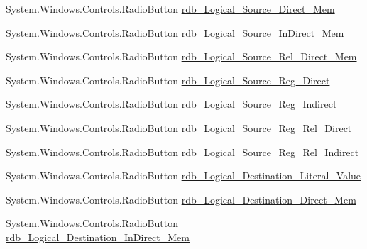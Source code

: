 \begin{DoxyCompactItemize}
\item 
System.\+Windows.\+Controls.\+Radio\+Button \hyperlink{class_c_p_u___o_s___simulator_1_1_instructions_window_ac6abe68bab4a6fbd16381f0524b36597}{rdb\+\_\+\+Logical\+\_\+\+Source\+\_\+\+Direct\+\_\+\+Mem}
\item 
System.\+Windows.\+Controls.\+Radio\+Button \hyperlink{class_c_p_u___o_s___simulator_1_1_instructions_window_a793b4134523511acef0c0212cb7a04fd}{rdb\+\_\+\+Logical\+\_\+\+Source\+\_\+\+In\+Direct\+\_\+\+Mem}
\item 
System.\+Windows.\+Controls.\+Radio\+Button \hyperlink{class_c_p_u___o_s___simulator_1_1_instructions_window_a1611a37bbfa3082c1d5b1e6cb4b6374d}{rdb\+\_\+\+Logical\+\_\+\+Source\+\_\+\+Rel\+\_\+\+Direct\+\_\+\+Mem}
\item 
System.\+Windows.\+Controls.\+Radio\+Button \hyperlink{class_c_p_u___o_s___simulator_1_1_instructions_window_aa29eed1b443e623542ec94bedba2dbaf}{rdb\+\_\+\+Logical\+\_\+\+Source\+\_\+\+Reg\+\_\+\+Direct}
\item 
System.\+Windows.\+Controls.\+Radio\+Button \hyperlink{class_c_p_u___o_s___simulator_1_1_instructions_window_ae7d85bca09170c0028ecb4455189f2cf}{rdb\+\_\+\+Logical\+\_\+\+Source\+\_\+\+Reg\+\_\+\+Indirect}
\item 
System.\+Windows.\+Controls.\+Radio\+Button \hyperlink{class_c_p_u___o_s___simulator_1_1_instructions_window_a1da5b1da06fb53fbfe626829e48e77b4}{rdb\+\_\+\+Logical\+\_\+\+Source\+\_\+\+Reg\+\_\+\+Rel\+\_\+\+Direct}
\item 
System.\+Windows.\+Controls.\+Radio\+Button \hyperlink{class_c_p_u___o_s___simulator_1_1_instructions_window_aef460d19110a239be5ce82ce747b1f5b}{rdb\+\_\+\+Logical\+\_\+\+Source\+\_\+\+Reg\+\_\+\+Rel\+\_\+\+Indirect}
\item 
System.\+Windows.\+Controls.\+Radio\+Button \hyperlink{class_c_p_u___o_s___simulator_1_1_instructions_window_a424e07112a50a407196c743bdb259b84}{rdb\+\_\+\+Logical\+\_\+\+Destination\+\_\+\+Literal\+\_\+\+Value}
\item 
System.\+Windows.\+Controls.\+Radio\+Button \hyperlink{class_c_p_u___o_s___simulator_1_1_instructions_window_a5aa422ef45e19119d61a6e19a9d66a38}{rdb\+\_\+\+Logical\+\_\+\+Destination\+\_\+\+Direct\+\_\+\+Mem}
\item 
System.\+Windows.\+Controls.\+Radio\+Button \hyperlink{class_c_p_u___o_s___simulator_1_1_instructions_window_a95c8b1f780ac251abddde941b4de5a89}{rdb\+\_\+\+Logical\+\_\+\+Destination\+\_\+\+In\+Direct\+\_\+\+Mem}
\item 

\end{DoxyCompactItemize}
